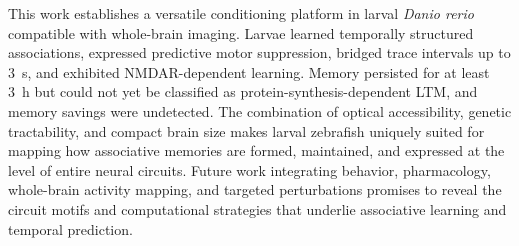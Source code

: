 This work establishes a versatile conditioning platform in larval \textit{Danio rerio} compatible with whole-brain imaging. Larvae learned temporally structured associations, expressed predictive motor suppression, bridged trace intervals up to 3~s, and exhibited NMDAR-dependent learning. Memory persisted for at least 3~h but could not yet be classified as protein-synthesis-dependent LTM, and memory savings were undetected. The combination of optical accessibility, genetic tractability, and compact brain size makes larval zebrafish uniquely suited for mapping how associative memories are formed, maintained, and expressed at the level of entire neural circuits. Future work integrating behavior, pharmacology, whole-brain activity mapping, and targeted perturbations promises to reveal the circuit motifs and computational strategies that underlie associative learning and temporal prediction.
